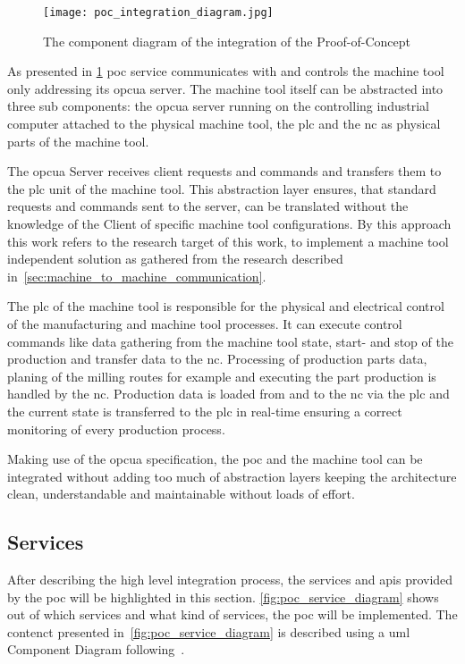 \documentclass[
a4paper,
twoside,
headsepline,
cleardoublepage=empty,
parskip=half,
draft=false
]{scrbook}
\begin{document}
				\begin{figure}[htbp]
					\centering
					\texttt{[image: poc\_integration\_diagram.jpg]}
					\caption{The component diagram of the integration of the Proof-of-Concept}
					\label{fig:poc_integration_diagram}
				\end{figure}

				As presented in \cref{fig:poc_integration_diagram} \gls{poc} service communicates with and controls the machine tool only addressing its \gls{opcua} server. The machine tool itself can be abstracted into three sub components: the \gls{opcua} server running on the controlling industrial computer attached to the physical machine tool, the \gls{plc} and the \gls{nc} as physical parts of the machine tool.

				The \gls{opcua} Server receives client requests and commands and transfers them to the \gls{plc} unit of the machine tool. This abstraction layer ensures, that standard requests and commands sent to the server, can be translated without the knowledge of the Client of specific machine tool configurations.
				By this approach this work refers to the research target of this work, to implement a machine tool independent solution as gathered from the research described in~\cref{sec:machine_to_machine_communication}.

				The \gls{plc} of the machine tool is responsible for the physical and electrical control of the manufacturing and machine tool processes. It can execute control commands like data gathering from the machine tool state, start- and stop of the production and transfer data to the \gls{nc}. Processing of production parts data, planing of the milling routes for example and executing the part production is handled by the \gls{nc}. Production data is loaded from and to the \gls{nc} via the \gls{plc} and the current state is transferred to the \gls{plc} in real-time ensuring a correct monitoring of every production process.

				Making use of the \gls{opcua} specification, the \gls{poc} and the machine tool can be integrated without adding too much of abstraction layers keeping the architecture clean, understandable and maintainable without loads of effort.

			\subsection{Services} \label{subsec:services}

				After describing the high level integration process, the services and \gls{api}s provided by the \gls{poc} will be highlighted in this section. \cref{fig:poc_service_diagram} shows out of which services and what kind of services, the \gls{poc} will be implemented. The contenct presented in~\cref{fig:poc_service_diagram} is described using a \gls{uml} Component Diagram following~\cite{uml2017}.
				
\end{document}
